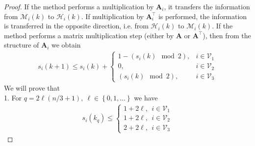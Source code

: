 \documentclass[10pt,a4paper]{amsart}
\newcommand{\braces}[1]{\left\{ #1 \right\}}
\newcommand{\cH}{\mathcal{H}}
\newcommand{\cM}{\mathcal{M}}
\newcommand{\cV}{\mathcal{V}}
\newcommand{\mA}{\mathbf{A}}
\begin{document}
\begin{proof}
	If the method performs a multiplication by $\mA_i$, it transfers the information from $\cM_i(k)$ to $\cH_i(k)$. If multiplication by $\mA_i^\top$ is performed, the information is transferred in the opposite direction, i.e. from $\cH_i(k)$ to $\cM_i(k)$. If the method performs a matrix multiplication step (either by $\mA$ or $\mA^\top$), then from the structure of $\mA_i$ we obtain
	\begin{align*}
		s_i(k+1)\leq s_i(k) + \begin{cases} 1 - (s_i(k) \mod 2), &i\in\cV_1 \\ 0, &i\in\cV_2 \\ (s_i(k)\mod 2), &i\in\cV_3 \end{cases}
	\end{align*}
	We will prove that\\
	1. For $q = 2\ell(n/3 + 1),~ \ell\in\braces{0, 1, \ldots}$ we have
	\begin{align}\label{eq:info_flow_even}
		s_i(k_q)\leq
		\begin{cases}
			1 + 2\ell,~~ i\in\cV_1 \\
			1 + 2\ell,~~ i\in\cV_2 \\
			2 + 2\ell,~~ i\in\cV_3

\end{cases}
\end{align}
\end{proof}
\end{document}
